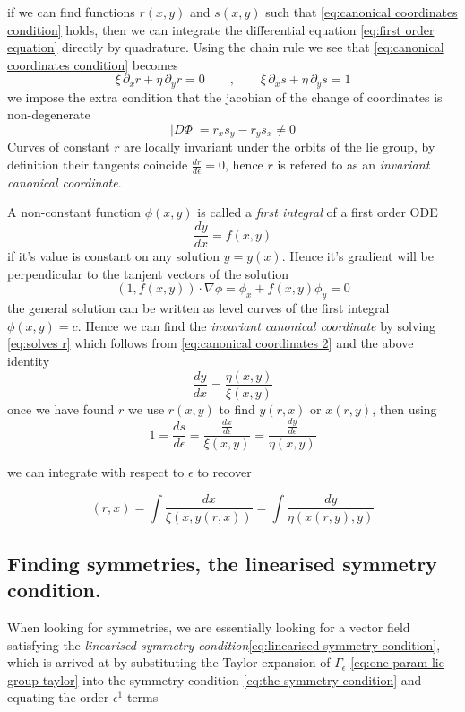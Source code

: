 \documentclass[12pt]{article}
\begin{document}
if we can find functions $r(x,y)$ and $s(x,y)$ such that \eqref{eq:canonical coordinates condition} holds, then we can integrate the differential equation \eqref{eq:first order equation} directly by quadrature. Using the chain rule we see that \eqref{eq:canonical coordinates condition} becomes
\begin{equation}\label{eq:canonical coordinates 2}
    \xi\,\partial_xr + \eta\,\partial_yr = 0\qquad,\qquad \xi\,\partial_xs + \eta\,\partial_ys = 1
\end{equation}
we impose the extra condition that the jacobian of the change of coordinates is non-degenerate
$$
\left|D\Phi \right| = r_xs_y - r_ys_x \neq 0
$$
Curves of constant $r$ are locally invariant under the orbits of the lie group, by definition their tangents coincide $\frac{dr}{d\epsilon}=0$, hence $r$ is refered to as an \textit{invariant canonical coordinate}. 

A non-constant function $\phi(x,y)$ is called a \textit{first integral} of a first order ODE 
$$\frac{dy}{dx} = f(x,y)$$
if it's value is constant on any solution $y=y(x)$. Hence it's gradient will be perpendicular to the tanjent vectors of the solution
$$(1,f(x,y)) \cdot \nabla \phi = \phi_x + f(x,y)\phi_y = 0$$
the general solution can be written as level curves of the first integral $\phi(x,y)=c$. Hence we can find the \textit{invariant canonical coordinate} by solving \eqref{eq:solves r} which follows from \eqref{eq:canonical coordinates 2} and the above identity
\begin{equation}\label{eq:solves r}
    \frac{dy}{dx} = \frac{\eta(x,y)}{\xi(x,y)}
\end{equation}
once we have found $r$ we use $r(x,y)$ to find $y(r,x)$ or $x(r,y)$, then using 
$$1 = \frac{ds}{d\epsilon} = \frac{\frac{dx}{d\epsilon}}{\xi(x,y)} = \frac{\frac{dy}{d\epsilon}}{\eta(x,y)}$$

we can integrate with respect to $\epsilon$ to recover  

\begin{equation}\label{eq:solving for s}(r,x) = \int \frac{dx}{\xi(x,y(r,x))} = \int \frac{dy}{\eta(x(r,y),y)}
\end{equation} 

\subsection{Finding symmetries, the linearised symmetry condition.}

When looking for symmetries, we are essentially looking for a vector field satisfying  the \textit{linearised symmetry condition}\eqref{eq:linearised symmetry condition}, which is arrived at by substituting the Taylor expansion of $\Gamma_\epsilon$ \eqref{eq:one param lie group taylor} into the symmetry condition \eqref{eq:the symmetry condition} and equating the order $\epsilon^1$ terms
\end{document}

